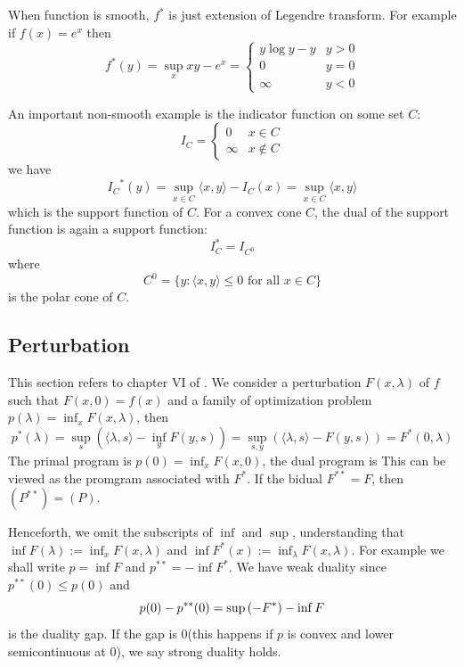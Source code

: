 \documentclass[a4paper]{mynotes}
\begin{document}
When function is smooth,  $f^*$ is just extension of Legendre transform. For example if $f(x)=e^x$ then $$f^*(y)=\sup_x  xy -e^x=\begin{cases}
y\log y-y & y>0\\
0 & y=0\\\infty & y<0
\end{cases}$$

An important non-smooth example is the indicator function on some set $C$:
 $$I_C=\begin{cases}
0 & x\in C\\
\infty & x\notin C
\end{cases}$$  we have $${I_C}^*(y)=\sup_{x\in C} \langle x,y\rangle-{I_C}(x)= \sup_{x\in C} \langle x,y\rangle $$ which is the support function of $C$. For a convex cone $C$, the dual of the support function is again a support function: $$I_C^*=I_{C^0}$$ where $$C^0=\{y:\langle x,y\rangle\le 0 \text{ for all } x\in C\}$$ is the polar cone of $C$.

\subsection{Perturbation}\label{sec:perturbation}
This section refers to chapter VI of \cite{roc}. We consider a perturbation $F(x,\lambda)$ of $f$ such that $F(x,0)=f(x)$ and a family of optimization problem $p(\lambda)=\inf_x F(x,\lambda)$, then $$p^{*}(\lambda)= \sup_s \left( \langle \lambda, s \rangle - \inf_y F (y, s) \right)=\sup_{s,y} \left( \langle \lambda, s \rangle -F(y, s) \right)=F^*(0,\lambda)$$
The primal program is $p(0)=\inf_x F(x,0)$, the dual program is
This can be viewed as the promgram associated with $F^*$. If the bidual $F^{**}=F$, then $(P^{**})=(P)$.

Henceforth, we omit the subscripts of $\inf$ and $\sup$, understanding that $\inf F(\lambda) := \inf_x F(x, \lambda)$ and $\inf F^*(x) := \inf_\lambda F(x, \lambda)$. For example we shall write $p=\inf F$ and $p^{**}=-\inf F^*$. We have weak duality  since $p^{**}(0)\le p(0)$ and $$p(0)-p^{**}(0)=\sup\left(- F^*\right)-\inf F$$ is the duality gap. If the gap is 0(this happens if $p$ is convex and lower semicontinuous at $0$), we say strong duality holds.
\end{document}
